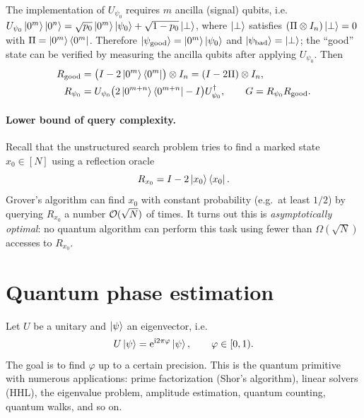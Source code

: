 \begin{example}
The implementation of $U_{\psi_0}$ requires $m$ ancilla (signal) qubits, i.e.
$U_{\psi_0}\ket{0^m}\ket{0^n} = \sqrt{p_0}\ket{0^m}\ket{\psi_0} + \sqrt{1-p_0}\ket{\perp}$,
where $\ket{\perp}$ satisfies $(\Pi \otimes I_n)\ket{\perp} = 0$ with
$\Pi = \ket{0^m}\bra{0^m}$. Therefore
$\ket{\psi_{\mathrm{good}}} = \ket{0^m}\ket{\psi_0}$ and
$\ket{\psi_{\mathrm{bad}}} = \ket{\perp}$; the ``good'' state can be verified by
measuring the ancilla qubits after applying $U_{\psi_0}$. Then
\begin{align}
  R_{\mathrm{good}} &= \bigl(I - 2\ket{0^m}\bra{0^m}\bigr) \otimes I_n = (I - 2\Pi) \otimes I_n, \\
  R_{\psi_0} &= U_{\psi_0}\bigl(2\ket{0^{m+n}}\bra{0^{m+n}} - I\bigr)U_{\psi_0}^{\dagger}, \qquad
  G = R_{\psi_0} R_{\mathrm{good}}.
\end{align}
\end{example}

\paragraph{Lower bound of query complexity.}
Recall that the unstructured search problem tries to find a marked state
$x_0 \in [N]$ using a reflection oracle
\begin{equation}
  R_{x_0} = I - 2\ket{x_0}\bra{x_0}.
\end{equation}
Grover's algorithm can find $x_0$ with constant probability (e.g.\ at least
$1/2$) by querying $R_{x_0}$ a number $\mathcal{O}(\sqrt{N})$ of times. It turns out
this is \emph{asymptotically optimal}: no quantum algorithm can perform this task
using fewer than $\Omega(\sqrt{N})$ accesses to $R_{x_0}$.

\section{Quantum phase estimation}\label{sec:sec02-qpe}

Let $U$ be a unitary and $\ket{\psi}$ an eigenvector, i.e.
\begin{equation}
  U\ket{\psi} = \mathrm{e}^{\mathrm{i} 2\pi\varphi}\ket{\psi}, \qquad \varphi \in [0,1).
\end{equation}
The goal is to find $\varphi$ up to a certain precision. This is the quantum
primitive with numerous applications: prime factorization (Shor's algorithm),
linear solvers (HHL), the eigenvalue problem, amplitude estimation, quantum
counting, quantum walks, and so on.

